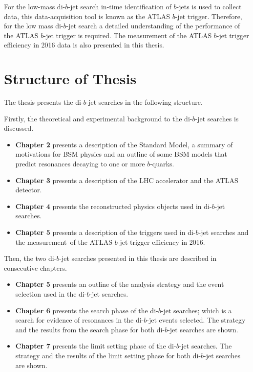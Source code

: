 For the low-mass di-$b$-jet search in-time identification of $b$-jets is used to collect data,
this data-acquisition tool is known as the ATLAS $b$-jet trigger.
Therefore, for the low mass di-$b$-jet search a detailed understanding of the performance of the ATLAS $b$-jet trigger is required.
The measurement of the ATLAS $b$-jet trigger efficiency in 2016 data is also presented in this thesis.

\section{Structure of Thesis}

The thesis presents the di-$b$-jet searches in the following structure.

\noindent
Firstly, the theoretical and experimental background to the di-$b$-jet searches is discussed.
\begin{itemize}[leftmargin=*]
\item\textbf{Chapter 2} presents a description of the Standard Model,
  a summary of motivations for BSM physics and
  an outline of some BSM models that predict resonances
  decaying to one or more $b$-quarks.\vspace{0.5em}
\item\textbf{Chapter 3} presents a description of the LHC accelerator and the ATLAS detector.\vspace{0.5em}
\item\textbf{Chapter 4} presents the reconstructed physics objects used in di-$b$-jet searches. \vspace{0.5em}
\item\textbf{Chapter 5} presents a description of the triggers used in di-$b$-jet searches
  and the measurement~of the ATLAS $b$-jet trigger efficiency in 2016. \vspace{0.5em}
\end{itemize}
\noindent
Then, the two di-$b$-jet searches presented in this thesis are described in consecutive chapters.
\begin{itemize}[leftmargin=*]
\item\textbf{Chapter 5} presents an outline of the analysis strategy and the event selection used in the \mbox{di-$b$-jet} searches.\vspace{0.5em}
\item\textbf{Chapter 6} presents the search phase of the di-$b$-jet searches;
  which is a search for evidence of resonances in the di-$b$-jet events selected.
  The strategy and the results from the search phase for both di-$b$-jet searches are shown.\vspace{0.5em}
\item\textbf{Chapter 7} presents the limit setting phase of the di-$b$-jet searches.
  The strategy and the results of the limit setting phase for both di-$b$-jet searches are shown.\vspace{0.5em}
\end{itemize}
